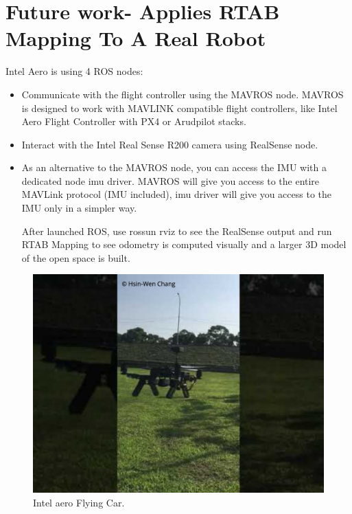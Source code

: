 \documentclass[10pt,journal,compsoc]{IEEEtran}
\begin{document}
\section{Future work- Applies RTAB Mapping To A Real Robot}
 Intel Aero is using 4 ROS nodes:
\begin{itemize}
\item Communicate with the flight controller using the MAVROS node. MAVROS is designed to work with MAVLINK compatible flight controllers, like Intel Aero Flight Controller with PX4 or Arudpilot stacks.
\item Interact with the Intel Real Sense R200 camera using RealSense node.
\item As an alternative to the MAVROS node, you can access the IMU with a dedicated node imu driver. MAVROS will give you access to the entire MAVLink protocol (IMU included), imu driver will give you access to the IMU only in a simpler way. 

After launched ROS, use rossun rviz to see the RealSense output and run RTAB Mapping to see odometry is computed visually and a larger 3D model of the open space is built.
\end{itemize}
\begin{figure}[thpb]
      \centering
      \includegraphics[width=\linewidth]{aero.jpeg}
      \caption{Intel aero Flying Car.}
      \label{fig:robot1}
\end{figure}
\end{document}
